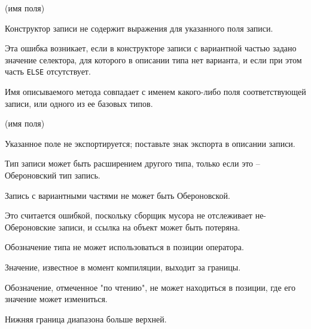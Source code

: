 (имя поля)

Конструктор записи не содержит выражения для указанного поля записи.


Эта ошибка возникает, если в конструкторе записи с вариантной частью
задано значение селектора, для которого в описании типа
нет варианта, и если при этом часть \verb'ELSE' отсутствует.


Имя описываемого метода совпадает с именем какого-либо поля
соответствующей записи, или одного из ее базовых типов.

(имя поля)

Указанное поле не экспортируется; поставьте знак экспорта в 
описании записи.

%


Тип записи может быть расширением другого типа, только если это --
Обероновский тип запись.


Запись с вариантными частями не может быть Обероновской.


Это считается ошибкой, поскольку сборщик мусора не отслеживает
не-Обероновские записи, и ссылка на объект может быть потеряна.


Обозначение типа не может использоваться в позиции оператора.


Значение, известное в момент компиляции, выходит за границы.


Обозначение, отмеченное "по чтению", не может находиться в 
позиции, где его значение может измениться.


Нижняя граница диапазона больше верхней.

